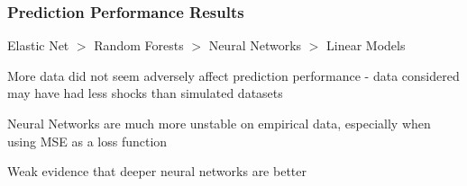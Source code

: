 \documentclass[aspectratio=169]{beamer}
\begin{document}


\begin{frame}
\frametitle{Prediction Performance Results}

Elastic Net $>$ Random Forests $>$ Neural Networks $>$ Linear Models

More data did not seem adversely affect prediction performance - data considered may have had less shocks than simulated datasets

Neural Networks are much more unstable on empirical data, especially when using MSE as a loss function

Weak evidence that deeper neural networks are better
\end{frame}
\end{document}
